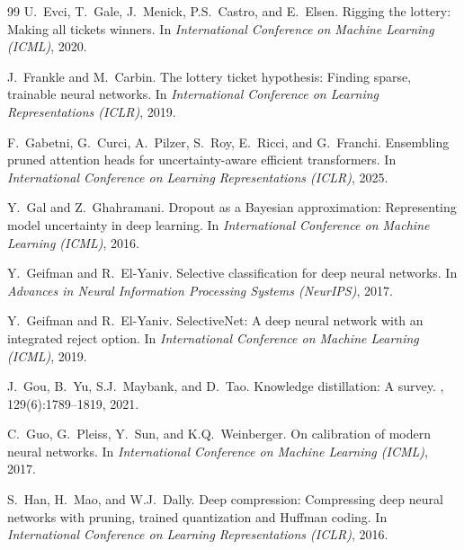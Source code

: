 \documentclass[letterpaper]{article} %
\begin{document}
\begin{thebibliography}{99}
U.~Evci, T.~Gale, J.~Menick, P.S.~Castro, and E.~Elsen.
\newblock Rigging the lottery: Making all tickets winners.
\newblock In {\em International Conference on Machine Learning (ICML)}, 2020.

J.~Frankle and M.~Carbin.
\newblock The lottery ticket hypothesis: Finding sparse, trainable neural networks.
\newblock In {\em International Conference on Learning Representations (ICLR)}, 2019.

F.~Gabetni, G.~Curci, A.~Pilzer, S.~Roy, E.~Ricci, and G.~Franchi.
\newblock Ensembling pruned attention heads for uncertainty-aware efficient transformers.
\newblock In {\em International Conference on Learning Representations (ICLR)}, 2025.

Y.~Gal and Z.~Ghahramani.
\newblock Dropout as a Bayesian approximation: Representing model uncertainty in deep learning.
\newblock In {\em International Conference on Machine Learning (ICML)}, 2016.

Y.~Geifman and R.~El-Yaniv.
\newblock Selective classification for deep neural networks.
\newblock In {\em Advances in Neural Information Processing Systems (NeurIPS)}, 2017.

Y.~Geifman and R.~El-Yaniv.
\newblock SelectiveNet: A deep neural network with an integrated reject option.
\newblock In {\em International Conference on Machine Learning (ICML)}, 2019.

J.~Gou, B.~Yu, S.J.~Maybank, and D.~Tao.
\newblock Knowledge distillation: A survey.
, 129(6):1789--1819, 2021.

C.~Guo, G.~Pleiss, Y.~Sun, and K.Q.~Weinberger.
\newblock On calibration of modern neural networks.
\newblock In {\em International Conference on Machine Learning (ICML)}, 2017.

S.~Han, H.~Mao, and W.J.~Dally.
\newblock Deep compression: Compressing deep neural networks with pruning, trained quantization and Huffman coding.
\newblock In {\em International Conference on Learning Representations (ICLR)}, 2016.


\end{thebibliography}
\end{document}
